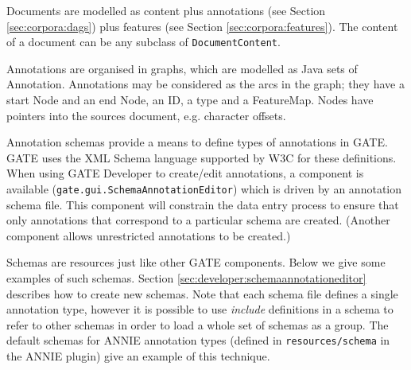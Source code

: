 
Documents are modelled as content plus annotations (see Section
\ref{sec:corpora:dags}) plus features (see Section \ref{sec:corpora:features}).
The content of a document can be any subclass of {\tt DocumentContent}.



Annotations are organised in graphs, which are modelled as Java sets of 
Annotation.  Annotations may be considered as the arcs in the graph; 
they have a start Node and an end Node, an ID, a type and a
FeatureMap. Nodes have pointers into the sources document, e.g. character
offsets.



Annotation schemas provide a means to define types of annotations in GATE.
GATE uses the XML Schema language supported by W3C for these definitions.
When using GATE Developer to
create/edit annotations, a component is available
({\tt gate.gui.SchemaAnnotationEditor}) which is
driven by an annotation schema file. This component will constrain the data
entry process to ensure that only annotations that correspond to a particular
schema are created. (Another component allows unrestricted annotations to be
created.)

Schemas are resources just like other GATE components. Below we give some
examples of such schemas. Section \ref{sec:developer:schemaannotationeditor}
describes how to create new schemas.  Note that each schema file defines a
single annotation type, however it is possible to use \emph{include}
definitions in a schema to refer to other schemas in order to load a whole set
of schemas as a group.  The default schemas for ANNIE annotation types (defined
in \verb!resources/schema! in the ANNIE plugin) give an example of this
technique.

\small
